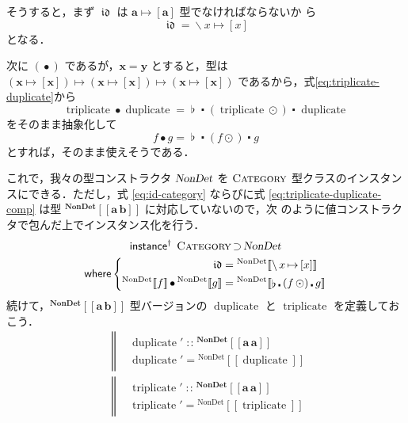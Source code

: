 \documentclass[a5paper,twoside,fleqn,draft]{jsbook}
\def\[{[\![}
\def\]{]\!]}
\newcommand{\mBrace}{\Vert}
\newcommand{\mKeyword}[1]{\mathsf{#1}}
\newcommand{\mInstanceDeclKeyword}{\mKeyword{instance}}
\newcommand{\mWhereKeyword}{\mKeyword{where}}
\DeclareMathOperator{\mInstanceDeclPolymorphic}{\mInstanceDeclKeyword^{\dagger}}
\DeclareMathOperator{\mSuperSet}{\supset}
\DeclareMathOperator{\mWhere}{\mWhereKeyword}
\newcommand{\mSpecialFunc}[1]{#1}
\newcommand{\mVarSpecialFunc}[1]{\mathfrak{#1}}
\DeclareMathOperator{\mDuplicate}{\mSpecialFunc{duplicate}}
\DeclareMathOperator{\mIdCat}{\mVarSpecialFunc{id}}
\DeclareMathOperator{\mTriplicate}{\mSpecialFunc{triplicate}}
\DeclareMathOperator{\mComp}{\centerdot}
\DeclareMathOperator{\mCompCat}{\bullet}
\DeclareMathOperator{\mFuncArrow}{\mapsto}
\DeclareMathOperator{\mIn}{{:\!:}}
\DeclareMathOperator{\mJoinList}{\flat} %
\DeclareMathOperator{\mLambda}{\backslash}
\DeclareMathOperator{\mLambdaArrow}{\mapsto}
\DeclareMathOperator{\mMapList}{\odot}
\newcommand{\mType}[1]{\mathbf{#1}} %
\newcommand{\mA}{\mType{a}}
\newcommand{\mB}{\mType{b}}
\newcommand{\mX}{\mType{x}}
\newcommand{\mY}{\mType{y}}
\newcommand{\mTypeAssemble}[2]{{}^\mType{#1}\[\mType{#2}\]}
\newcommand{\mTypeConstructor}[1]{\textsl{#1}}
\newcommand{\mValueConstructor}[1]{\mathrm{#1}}
\newcommand{\mValueWith}[2]{{}^\mValueConstructor{#1}\[#2\]}
\newcommand{\mTypeClass}[1]{\textsc{#1}} %
\newcommand{\mCategoryTypeClass}{\mTypeClass{Category}}
\newcommand{\mLambdaEXP}[2]{\mLambda{#1}\mLambdaArrow{#2}} %
\begin{document}
そうすると，まず $\mIdCat$ は $\mA\mFuncArrow[\mA]$ 型でなければならないか
ら
\begin{equation}
  \label{eq:id-category}
  \mIdCat
  =\mLambda x\mLambdaArrow[x]
\end{equation}
となる．

次に $(\mCompCat)$ であるが，$\mX=\mY$ とすると，型は
$(\mX\mFuncArrow[\mX])\mFuncArrow(\mX\mFuncArrow[\mX])\mFuncArrow(\mX\mFuncArrow[\mX])$
であるから，式\eqref{eq:triplicate-duplicate}から
\begin{equation}
  \mTriplicate\mCompCat\mDuplicate
  =\mJoinList\mComp(\mTriplicate\mMapList)\mComp\mDuplicate
\end{equation}
をそのまま抽象化して
\begin{equation}
  \label{eq:triplicate-duplicate-comp}
  f\mCompCat g=\mJoinList\mComp(f\mMapList)\mComp g
\end{equation}
とすれば，そのまま使えそうである．

これで，我々の型コンストラクタ $\mTypeConstructor{NonDet}$ を
$\mCategoryTypeClass$ 型クラスのインスタンスにできる．ただし，式
\eqref{eq:id-category} ならびに式 \eqref{eq:triplicate-duplicate-comp}
は型 $\mTypeAssemble{NonDet}{\mA\,\mB}$ に対応していないので，次
のように値コンストラクタで包んだ上でインスタンス化を行う．
\begin{multline}
  \label{eq:nondet-instance}
  \mInstanceDeclPolymorphic\;
  \mTypeClass{Category}\mSuperSet\mTypeConstructor{NonDet}\\
  \mWhere\left\{
  \begin{aligned}
    \mIdCat
    &=\mValueWith{NonDet}{\mLambdaEXP{x}{[x]}}\\
    \mValueWith{NonDet}{f}\mCompCat\mValueWith{NonDet}{g}
    &=\mValueWith{NonDet}{\mJoinList\mComp{}(f\mMapList)\mComp g}
  \end{aligned}
  \right.
\end{multline}
続けて，$\mTypeAssemble{NonDet}{\mA\,\mB}$ 型バージョンの
$\mDuplicate$ と $\mTriplicate$ を定義しておこう．
\begin{align}
  &\left\mBrace
  \begin{aligned}
    &\mDuplicate'
    \mIn\mTypeAssemble{NonDet}{\mA\,\mA}\\
    &\mDuplicate'
    =\mValueWith{NonDet}{\mDuplicate}
  \end{aligned}
  \right.\\
  &\left\mBrace
  \begin{aligned}
    &\mTriplicate'
    \mIn\mTypeAssemble{NonDet}{\mA\,\mA}\\
    &\mTriplicate'
    =\mValueWith{NonDet}{\mTriplicate}
  \end{aligned}
  \right.
\end{align}
\end{document}
